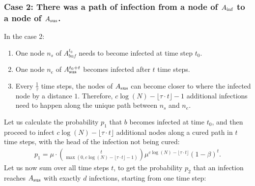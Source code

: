 \subsubsection{Case 2: There was a path of infection from a node of $A_{{\rm inf}}$ to a node of $A_{{\rm sus}}$.}
In the case 2:
\begin{enumerate}
	\item One node $n_s$ of $A_{buf}^{t_0}$ needs to become infected at time step $t_0$.
	\item One node $n_e$ of $A_{{\rm sus}}^{t_0 + t}$ becomes infected after $t$ time steps.
	\item Every $\frac{1}{\tau}$ time steps, the nodes of $A_{{\rm sus}}$ can become closer to where the infected node by a distance $1$. Therefore, $c\log(N) -\lfloor \tau\cdot t \rfloor - 1$ additional infections need to happen along the unique path between $n_s$ and $n_e$.
\end{enumerate}
Let us calculate the probability $p_1$ that $b$ becomes infected at time $t_0$, and then proceed to infect $c\log(N) -\lfloor \tau\cdot t \rfloor$ additional nodes along a cured path in  $t$ time steps, with the head of the infection not being cured:
\begin{align*}
p_1 = \mu \cdot {t \choose \max(0, c\log(N) -\lfloor \tau\cdot t \rfloor  - 1)} \mu^{c\log(N) -\lfloor \tau\cdot t \rfloor}(1-\beta)^{t}.
\end{align*}
Let us now sum over all time steps $t$, to get the probability $p_2$ that an infection reaches $A_{{\rm sus}}$ with exactly $d$ infections, starting from one time step:

